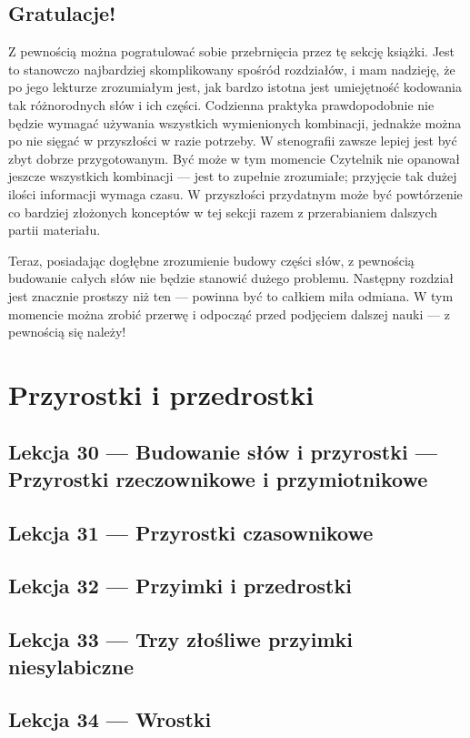 \documentclass[12p, oneside]{book}
\begin{document}
\newpage
\section*{Gratulacje!}
Z pewnością można pogratulować sobie przebrnięcia przez tę sekcję książki. 
Jest to stanowczo najbardziej skomplikowany spośród rozdziałów, i mam nadzieję, że po jego lekturze
zrozumiałym jest, jak bardzo istotna jest umiejętność kodowania tak różnorodnych słów i ich części. Codzienna praktyka prawdopodobnie nie będzie wymagać używania wszystkich wymienionych kombinacji, jednakże można po nie sięgać w przyszłości w razie potrzeby. W stenografii zawsze lepiej jest być zbyt dobrze przygotowanym. Być może w tym momencie Czytelnik nie opanował jeszcze wszystkich kombinacji --- jest to zupełnie zrozumiałe; przyjęcie tak dużej ilości informacji wymaga czasu. W przyszłości przydatnym może być powtórzenie co bardziej złożonych konceptów w tej sekcji razem z przerabianiem dalszych partii materiału.

Teraz, posiadając dogłębne zrozumienie budowy części słów, z pewnością budowanie całych słów nie będzie stanowić dużego problemu. Następny rozdział jest znacznie prostszy niż ten --- powinna być to całkiem miła odmiana. W tym momencie można zrobić przerwę i odpocząć przed podjęciem dalszej nauki --- z pewnością się należy!
\newpage

\chapter{Przyrostki i przedrostki}
\section{Lekcja 30 --- Budowanie słów i przyrostki --- Przyrostki rzeczownikowe i przymiotnikowe}
\newpage
\section{Lekcja 31 --- Przyrostki czasownikowe}
\newpage
\section{Lekcja 32 --- Przyimki i przedrostki}
\newpage
\section{Lekcja 33 --- Trzy złośliwe przyimki niesylabiczne}
\newpage
\section{Lekcja 34 --- Wrostki}
\newpage
\end{document}
